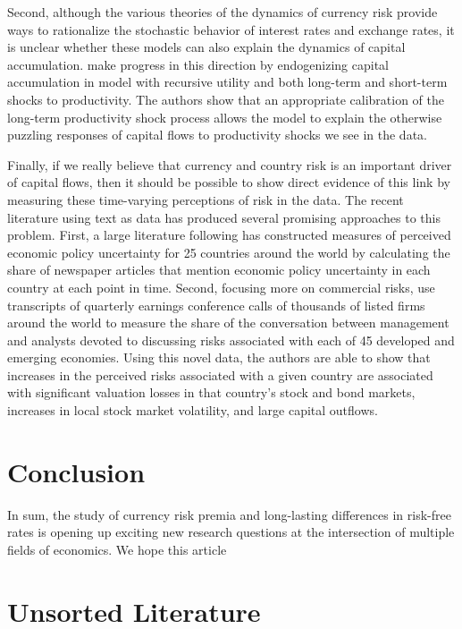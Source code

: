\documentclass{ar-1col}
\begin{document}
Second, although the various theories of the dynamics of currency risk provide ways to rationalize the stochastic behavior of interest rates and exchange rates, it is unclear whether these models can also explain the dynamics of capital accumulation. \citet{ColacitoCroceHoHoward2018} make progress in this direction by endogenizing capital accumulation in model with recursive utility and both long-term and short-term shocks to productivity. The authors show that an appropriate calibration of the long-term productivity shock process allows the model to explain
the otherwise puzzling responses of capital flows to productivity shocks we see in the data. 

Finally, if we really believe that currency and country risk is an important driver of capital flows, then it should be possible to show direct evidence of this link by measuring these time-varying perceptions of risk in the data. The recent literature using text as data has produced several promising approaches to this problem. First, a large literature following \cite{baker2016measuring} has constructed measures of perceived economic policy uncertainty for 25 countries around the world by calculating the share of newspaper articles that mention economic policy uncertainty in each country at each point in time. Second, focusing more on commercial risks, \cite{hassan2020country} use transcripts of quarterly earnings conference calls of thousands of listed firms around the world to measure the share of the conversation between management and analysts devoted to discussing risks associated with each of 45 developed and emerging economies. Using this novel data, the authors are able to show that increases in the perceived risks associated with a given country are associated with significant valuation losses in that country's stock and bond markets, increases in local stock market volatility, and large capital outflows. 


\section{Conclusion}

In sum, the study of currency risk premia and long-lasting differences in risk-free rates is opening up exciting new research questions at the intersection of multiple fields of economics. We hope this article  



\section*{Unsorted Literature}
\end{document}
